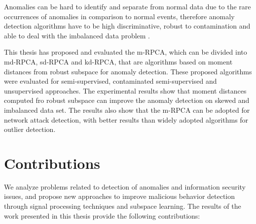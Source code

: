 Anomalies can be hard to identify and separate from normal data due to the rare occurrences of anomalies in comparison to normal events, therefore anomaly detection algorithms have to be high discriminative, robust to contamination and able to deal with the imbalanced data problem \cite{he2008learning}.

This thesis has proposed and evaluated the m-RPCA, which can be divided into md-RPCA, sd-RPCA and kd-RPCA, that are algorithms based on moment distances from robust subspace for anomaly detection. These proposed algorithms were evaluated for semi-supervised, contaminated semi-supervised and unsupervised approaches. The experimental results show that moment distances computed fro robust subspace can improve the anomaly detection on skewed and imbalanced data set. The results also show that the m-RPCA can be adopted for network attack detection, with better results than widely adopted algorithms for outlier detection.

\section{Contributions}
\label{sc:conc_contributions}

We analyze problems related to detection of anomalies and information security issues, and propose new approaches to improve malicious behavior detection through signal processing techniques and subspace learning. The results of the work presented in this thesis provide the following contributions:

